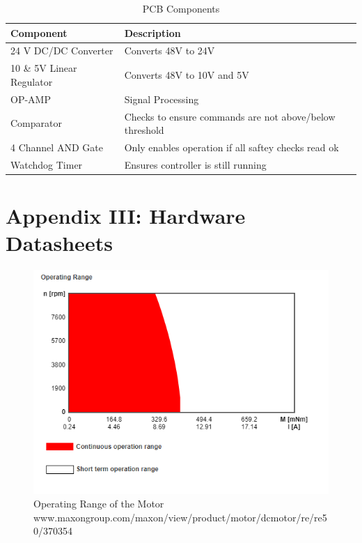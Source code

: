 \documentclass[12pt]{report}
\begin{document}
	\begin{table}[h]
	\centering
	\caption{PCB Components}	
	\begin{tabular}{|l|l|}
		\hline
		\textbf{Component} & \textbf{Description}  \\ \hline
		24 V DC/DC Converter & Converts 48V to 24V  \\ \hline
		10 \& 5V Linear Regulator & Converts 48V to 10V and 5V  \\ \hline
		OP-AMP & Signal Processing   \\ \hline
		Comparator & Checks to ensure commands are not above/below threshold   \\ \hline
		4 Channel AND Gate & Only enables operation if all saftey checks read ok   \\ \hline
		Watchdog Timer & Ensures controller is still running \\ \hline

		\end{tabular}
	\label{tab:belt}
	\end{table}

\chapter*{Appendix III: Hardware Datasheets} \label{ap:datasheets}

	\begin{figure}[h] 
		\centering
		\includegraphics[width=0.75\linewidth]{Motor_range}
		\caption{Operating Range of the Motor \newline \small www.maxongroup.com/maxon/view/product/motor/dcmotor/re/re50/370354}
		\label{fig:motor_range}
	\end{figure}
	
\end{document}
